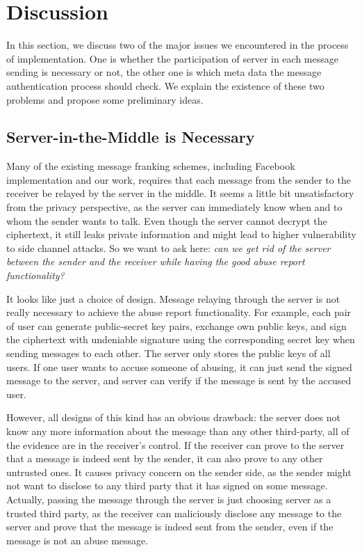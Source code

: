 
\section{Discussion}
In this section, we discuss two of the major issues we encountered in the process of implementation.
One is whether the participation of server in each message sending is necessary or not,
the other one is which meta data the message authentication process should check.
We explain the existence of these two problems
and propose some preliminary ideas.


\subsection{Server-in-the-Middle is Necessary}
Many of the existing message franking schemes,
including Facebook implementation and our work,
requires that each message from the sender to the receiver be relayed by the server in the middle.
It seems a little bit unsatisfactory from the privacy perspective,
as the server can immediately know when and to whom the sender wants to talk.
Even though the server cannot decrypt the ciphertext,
it still leaks private information and might lead to higher vulnerability to side channel attacks.
So we want to ask here: \emph{can we get rid of the server between the sender and the receiver while having the good abuse report functionality?}

It looks like just a choice of design.
Message relaying through the server is not really necessary to achieve the abuse report functionality.
For example, each pair of user can generate public-secret key pairs, exchange own public keys,
and sign the ciphertext with undeniable signature using the corresponding secret key when sending messages to each other.
The server only stores the public keys of all users.
If one user wants to accuse someone of abusing, it can just send the signed message to the server,
and server can verify if the message is sent by the accused user.

However, all designs of this kind has an obvious drawback:
the server does not know any more information about the message than any other third-party,
all of the evidence are in the receiver's control. 
If the receiver can prove to the server that a message is indeed sent by the sender,
it can also prove to any other untrusted ones.
It causes privacy concern on the sender side, 
as the sender might not want to disclose to any third party that it has signed on some message.
Actually, passing the message through the server
is just choosing server as a trusted third party,
as the receiver can maliciously disclose any message to the server and prove that the message is indeed sent from the sender,
even if the message is not an abuse message.


